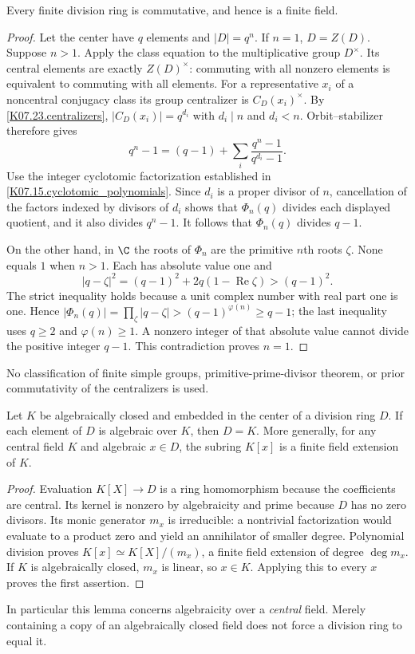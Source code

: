 \begin{theorem}
Every finite division ring is commutative, and hence is a finite field.
\end{theorem}
\begin{proof}
Let the center have $q$ elements and $|D|=q^n$. If $n=1$, $D=Z(D)$.
Suppose $n>1$. Apply the class equation to the multiplicative group
$D^\times$. Its central elements are exactly $Z(D)^\times$: commuting
with all nonzero elements is equivalent to commuting with all elements.
For a representative $x_i$ of a noncentral conjugacy class its group
centralizer is $C_D(x_i)^\times$. By
\ref{K07.23.centralizers}, $|C_D(x_i)|=q^{d_i}$ with
$d_i\mid n$ and $d_i<n$. Orbit--stabilizer therefore gives
\[
 q^n-1=(q-1)+\sum_i\frac{q^n-1}{q^{d_i}-1}.
\]
Use the integer cyclotomic factorization established in
\ref{K07.15.cyclotomic_polynomials}. Since $d_i$ is a proper divisor of
$n$, cancellation of the factors indexed by divisors of $d_i$ shows that
$\Phi_n(q)$ divides each displayed quotient, and it also divides
$q^n-1$. It follows that $\Phi_n(q)$ divides $q-1$.

On the other hand, in $\C$ the roots of $\Phi_n$ are the primitive
$n$th roots $\zeta$. None equals $1$ when $n>1$. Each has absolute value
one and
\[
 |q-\zeta|^2=(q-1)^2+2q(1-\operatorname{Re}\zeta)>(q-1)^2.
\]
The strict inequality holds because a unit complex number with real part
one is one. Hence
$|\Phi_n(q)|=\prod_\zeta |q-\zeta|>(q-1)^{\varphi(n)}\ge q-1$;
the last inequality uses $q\ge2$ and $\varphi(n)\ge1$.
A nonzero integer of that absolute value cannot divide the positive
integer $q-1$. This contradiction proves $n=1$.
\end{proof}
No classification of finite simple groups, primitive-prime-divisor theorem,
or prior commutativity of the centralizers is used.

\begin{lemma}
Let $K$ be algebraically closed and embedded in the center of a division
ring $D$. If each element of $D$ is algebraic over $K$, then $D=K$.
More generally, for any central field $K$ and algebraic $x\in D$, the
subring $K[x]$ is a finite field extension of $K$.
\end{lemma}
\begin{proof}
Evaluation $K[X]\to D$ is a ring homomorphism because the coefficients
are central. Its kernel is nonzero by algebraicity and prime because
$D$ has no zero divisors. Its monic generator $m_x$ is irreducible:
a nontrivial factorization would evaluate to a product zero and yield an
annihilator of smaller degree. Polynomial division proves
$K[x]\simeq K[X]/(m_x)$, a finite field extension of degree $\deg m_x$.
If $K$ is algebraically closed, $m_x$ is linear, so $x\in K$.
Applying this to every $x$ proves the first assertion.
\end{proof}
In particular this lemma concerns algebraicity over a \emph{central}
field. Merely containing a copy of an algebraically closed field does not
force a division ring to equal it.

